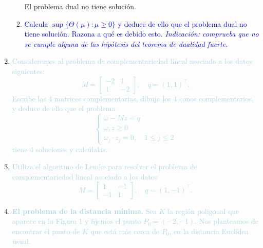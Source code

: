 \documentclass[12pt]{article}
\newcommand{\lb}[1]{\textcolor{lightblue}{#1}}
\newcommand{\db}[1]{\textcolor{blue}{#1}}
\begin{document}
\begin{enumerate}[label=\color{red}\arabic*.]
\begin{enumerate}[label=\color{red}\alph*)]
    	El problema dual no tiene solución.
    	\item \db{Calcula $\sup\{\Theta(\mu):\mu\ge0\}$ y deduce de ello que el problema dual no tiene solución. Razona a qué es debido esto. \textit{Indicación: comprueba que no se cumple alguna de las hipótesis del teorema de dualidad fuerte.}}
    \end{enumerate}
    \item \lb{Consideremos al problema de complementariedad lineal asociado a los datos siguientes: \[ M=\begin{bmatrix}
    -2 & 1 \\
    1 & -2
    \end{bmatrix},\quad q=(1,1)^\intercal. \] Escribe las 4 matrices complementarias, dibuja los 4 conos complementarios, y deduce de ello que el problema \[ \begin{cases}
    \omega-Mz=q\\
    \omega,z\ge0\\
    \omega_j\cdot z_j=0,\quad 1\le j\le 2
    \end{cases} \]tiene 4 soluciones y calcúlalas.}
    
    \item \lb{Utiliza el algoritmo de Lemke para resolver el problema de complementariedad lineal asociado a los datos \[ M=\begin{bmatrix}
    1 & -1 \\
    -1 & 1
    \end{bmatrix},\quad q=(1,-1)^\intercal.\]}
    
    \item \lb{\textbf{El problema de la distancia mínima.} Sea $K$ la región poligonal que aparece en la Figura 1 y fijemos el punto $P_0=(-2,-1)$. Nos planteamos de encontrar el punto de $K$ que está más cerca de $P_0$, en la distancia Euclídea usual.}
    
    \begin{center}
\end{center}
\end{enumerate}
\end{document}
